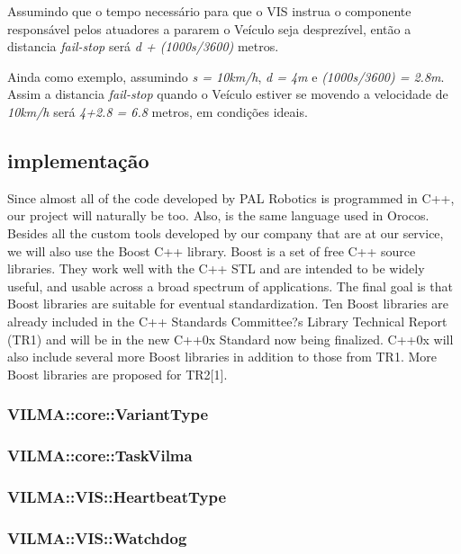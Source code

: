 \documentclass[conference]{IEEEtran}
\begin{document}
Assumindo que o tempo necessário para que o VIS instrua o componente responsável pelos atuadores a pararem o Veículo seja desprezível, então a distancia \textit{fail-stop} será \textit{d + (1000s/3600)} metros.

Ainda como exemplo, assumindo \textit{s = 10km/h}, \textit{d = 4m} e \textit{(1000s/3600) = 2.8m}. Assim a distancia \textit{fail-stop} quando o Veículo estiver se movendo a velocidade de \textit{10km/h} será \textit{4+2.8 = 6.8} metros, em condições ideais.


\subsection{implementação}\label{subsec:implementation}

Since almost all of the code developed by PAL Robotics is programmed
in C++, our project will naturally be too. Also, is the same language
used in Orocos.
Besides all the custom tools developed by our company that are at
our service, we will also use the Boost C++ library.
Boost is a set of free C++ source libraries. They work well with the
C++ STL and are intended to be widely useful, and usable across a
broad spectrum of applications. The final goal is that Boost libraries are
suitable for eventual standardization. Ten Boost libraries are already
included in the C++ Standards Committee?s Library Technical Report
(TR1) and will be in the new C++0x Standard now being finalized.
C++0x will also include several more Boost libraries in addition to
those from TR1. More Boost libraries are proposed for TR2[1].

\subsubsection{VILMA::core::VariantType}\label{subsubsec:variant_type}

\subsubsection{VILMA::core::TaskVilma}\label{subsubsec:task_vilma}

\subsubsection{VILMA::VIS::HeartbeatType}\label{subsubsec:heartbeat_type}

\subsubsection{VILMA::VIS::Watchdog}\label{subsubsec:watchdog}
\end{document}
